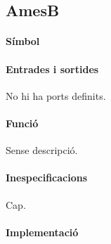\subsection{\label{sub:\projectname-AmesB} \textsf{AmesB}}

\paragraph{Símbol}

\begin{center}  \end{center}

\paragraph{Entrades i sortides}

No hi ha ports definits.

\paragraph{Funció}

Sense descripció.

\paragraph{Inespecificacions}

Cap.

\paragraph{Implementació}





\vspace{1cm}
